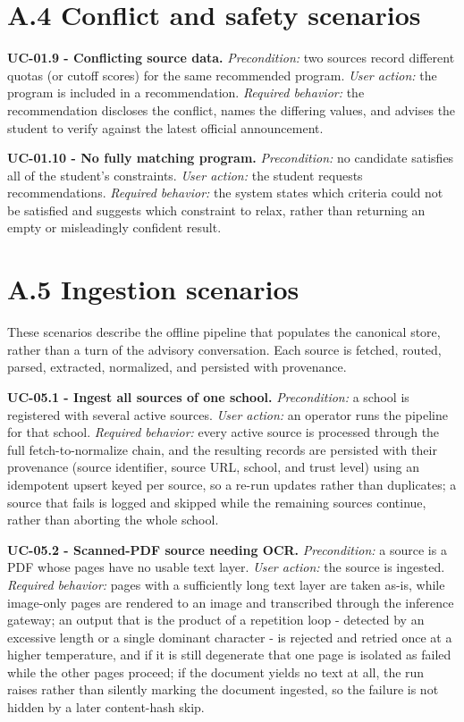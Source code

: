 \documentclass[../main.tex]{subfiles}
\begin{document}
\section*{A.4 Conflict and safety scenarios}

\textbf{UC-01.9 - Conflicting source data.}
\textit{Precondition:} two sources record different quotas (or cutoff scores) for the same recommended program.
\textit{User action:} the program is included in a recommendation.
\textit{Required behavior:} the recommendation discloses the conflict, names the differing values, and advises the student to verify against the latest official announcement.

\textbf{UC-01.10 - No fully matching program.}
\textit{Precondition:} no candidate satisfies all of the student's constraints.
\textit{User action:} the student requests recommendations.
\textit{Required behavior:} the system states which criteria could not be satisfied and suggests which constraint to relax, rather than returning an empty or misleadingly confident result.

\section*{A.5 Ingestion scenarios}

These scenarios describe the offline pipeline that populates the canonical store, rather than a turn of the advisory conversation. Each source is fetched, routed, parsed, extracted, normalized, and persisted with provenance.

\textbf{UC-05.1 - Ingest all sources of one school.}
\textit{Precondition:} a school is registered with several active sources.
\textit{User action:} an operator runs the pipeline for that school.
\textit{Required behavior:} every active source is processed through the full fetch-to-normalize chain, and the resulting records are persisted with their provenance (source identifier, source URL, school, and trust level) using an idempotent upsert keyed per source, so a re-run updates rather than duplicates; a source that fails is logged and skipped while the remaining sources continue, rather than aborting the whole school.

\textbf{UC-05.2 - Scanned-PDF source needing OCR.}
\textit{Precondition:} a source is a PDF whose pages have no usable text layer.
\textit{User action:} the source is ingested.
\textit{Required behavior:} pages with a sufficiently long text layer are taken as-is, while image-only pages are rendered to an image and transcribed through the inference gateway; an output that is the product of a repetition loop - detected by an excessive length or a single dominant character - is rejected and retried once at a higher temperature, and if it is still degenerate that one page is isolated as failed while the other pages proceed; if the document yields no text at all, the run raises rather than silently marking the document ingested, so the failure is not hidden by a later content-hash skip.
\end{document}
